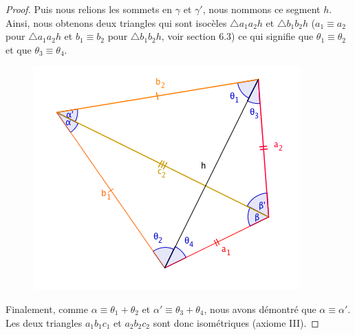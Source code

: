 \documentclass[a4paper,12pt]{article}
\begin{document}
\begin{proof}
 Puis nous relions les sommets en $\gamma$ et $\gamma'$, nous nommons ce segment $h$. Ainsi, nous obtenons deux triangles qui sont isocèles $\triangle a_1a_2h$ et $\triangle b_1b_2h$ ($a_1\equiv a_2$ pour $\triangle a_1a_2h$ et $b_1\equiv b_2$ pour $\triangle b_1b_2h$, voir section 6.3) ce qui signifie que $\theta_1 \equiv \theta_2$ et que $\theta_3 \equiv \theta_4$.
 
 
 \begin{figure}[H]
    \centering
    \includegraphics[scale=0.6]{schema/Cas3_3.png}
\end{figure}

 
 
 Finalement, comme $\alpha \equiv \theta_1 + \theta_2$ et $\alpha' \equiv \theta_3 + \theta_4$, nous avons démontré que $\alpha \equiv \alpha'$. Les deux triangles $a_1b_1c_1$ et $a_2b_2c_2$ sont donc isométriques (axiome III).
\end{proof}
\end{document}
